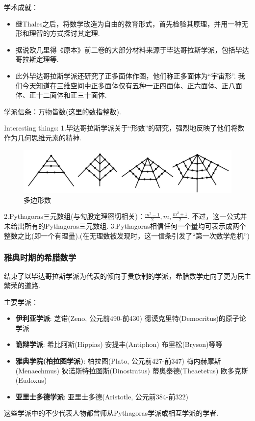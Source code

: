 \documentclass{Math_Note}
\begin{document}
学术成就：
\begin{itemize}
    \item 继Thales之后，将数学改造为自由的教育形式，首先检验其原理，并用一种无形和理智的方式探讨其定理.
    \item 据说欧几里得《原本》前二卷的大部分材料来源于毕达哥拉斯学派，包括毕达哥拉斯定理等.
    \item 此外毕达哥拉斯学派还研究了正多面体作图，他们称正多面体为“宇宙形”. 
    我们今天知道在三维空间中正多面体仅有五种一正四面体、正六面体、正八面体、正十二面体和正三十面体.
\end{itemize}

学派信条：万物皆数(这里的数指整数).

Interesting things: 
1.毕达哥拉斯学派关于“形数”的研究，强烈地反映了他们将数作为几何思维元素的精神.
\begin{figure}[H]
    \centering
    \includegraphics[scale=1.0]{"./Figures/Polygonal_number.png"}
    \caption*{多边形数}
\end{figure}
2.Pythagoras三元数组(与勾股定理密切相关)：$\frac{m^{2}-1}{2},m,\frac{m^{2}+1}{2}$. 不过，这一公式并未给出所有的Pythagoras三元数组. 
3.Pythagoras相信任何一个量均可表示成两个整数之比(即一个有理量).(在无理数被发现时，这一信条引发了“第一次数学危机”)

\subsubsection{雅典时期的希腊数学}
结束了以毕达哥拉斯学派为代表的倾向于贵族制的学派，希腊数学走向了更为民主繁荣的道路. 

主要学派：
\begin{itemize}
    \item \textbf{伊利亚学派}: 芝诺(Zeno, 公元前490-前430) 德谟克里特(Democritus)的原子论学派
    \item \textbf{诡辩学派}: 希比阿斯(Hippias) 安提丰(Antiphon) 布里松(Bryson)等等
    \item \textbf{雅典学院(柏拉图学派)}: 柏拉图(Plato, 公元前427-前347) 梅内赫摩斯(Menaechmus) 狄诺斯特拉图斯(Dinostratus) 蒂奥泰德(Theaetetus) 欧多克斯(Eudoxus)
    \item \textbf{亚里士多德学派}: 亚里士多德(Aristotle, 公元前384-前322)
\end{itemize}
这些学派中的不少代表人物都曾师从Pythagoras学派或相互学派的学者.
\end{document}
